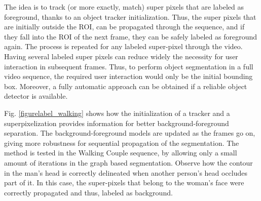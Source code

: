 \documentclass[a4paper, 10pt, conference]{ieeeconf}      %
\begin{document}
The idea is to track (or more exactly, match) super
pixels that are labeled as foreground, thanks to an
object tracker initialization. Thus, the super pixels
that are initially outside the ROI, can be propagated through the sequence,
and if they fall into the ROI of the next frame, they
can be safely labeled as foreground again. The process is
repeated for any labeled super-pixel through the
video. Having several labeled super pixels can reduce
widely the necessity for user interaction in
subsequent frames. Thus, to perform object
segmentation in a full video sequence, the required
user interaction would only be the initial bounding
box. Moreover, a fully automatic approach can be
obtained if a reliable object detector is available.

Fig. \ref{figurelabel_walking} shows how the initialization of a
tracker and a superpixelization provides information
for better background-foreground separation. The
background-foreground models are updated as the
frames go on, giving more robustness for sequential
propagation of the segmentation. The method is tested in the 
Walking Couple sequence,
by allowing only a small amount of iterations in the
graph based segmentation. Observe how the contour
in the man’s head is correctly delineated when
another person’s head occludes part of it. In this case,
the super-pixels that belong to the woman’s face
were correctly propagated and thus, labeled as
background. \\
\end{document}
